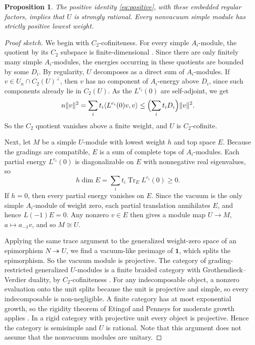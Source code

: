 \documentclass[11pt,a4paper]{article}
\newtheorem{proposition}[theorem]{Proposition}
\DeclareMathOperator{\Tr}{Tr}
\newcommand{\one}{\mathbf1}
\begin{document}
\begin{proposition}\label{prop:rational}
The positive identity \eqref{eq:positive}, with these embedded
regular factors, implies that $U$ is strongly rational. Every
nonvacuum simple module has strictly positive lowest weight.
\end{proposition}
\begin{proof}[Proof sketch]
We begin with $C_2$-cofiniteness. For every simple $A_i$-module, the
quotient by its $C_2$ subspace is finite-dimensional \cite{ABD}. Since
there are only finitely many simple $A_i$-modules, the energies
occurring in these quotients are bounded by some $D_i$. By regularity,
$U$ decomposes as a direct sum of $A_i$-modules. If
$v\in U_n\cap C_2(U)^\perp$, then $v$ has no component of
$A_i$-energy above $D_i$, since such components already lie in
$C_2(U)$. As the $L^{e_i}(0)$ are self-adjoint, we get
\begin{equation}\label{eq:C2}
 n\|v\|^2=\sum_i t_i\langle L^{e_i}(0)v,v\rangle
       \le\Bigl(\sum_i t_iD_i\Bigr)\|v\|^2.
\end{equation}
So the $C_2$ quotient vanishes above a finite weight, and $U$ is
$C_2$-cofinite.

Next, let $M$ be a simple $U$-module with lowest weight $h$ and top
space $E$. Because the gradings are compatible, $E$ is a sum of
complete tops of $A_i$-modules. Each partial energy $L^{e_i}(0)$ is
diagonalizable on $E$ with nonnegative real eigenvalues, so
\begin{equation}\label{eq:toptrace}
 h\dim E=\sum_i t_i\Tr_E L^{e_i}(0)\ge0.
\end{equation}
If $h=0$, then every partial energy vanishes on $E$. Since the vacuum
is the only simple $A_i$-module of weight zero, each partial
translation annihilates $E$, and hence $L(-1)E=0$. Any nonzero $v\in E$
then gives a module map $U\to M$, $a\mapsto a_{-1}v$, and so
$M\cong U$.

Applying the same trace argument to the generalized weight-zero space
of an epimorphism $N\twoheadrightarrow U$, we find a vacuum-like
preimage of $\one$, which splits the epimorphism. So the vacuum module
is projective. The category of grading-restricted generalized $U$-modules
is a finite braided category with Grothendieck--Verdier duality, by
$C_2$-cofiniteness \cite{McRae}. For any indecomposable object, a
nonzero evaluation onto the unit splits because the unit is projective
and simple, so every indecomposable is non-negligible. A finite
category has at most exponential growth, so the rigidity theorem of
Etingof and Penneys for moderate growth applies \cite{EP}. In a rigid
category with projective unit every object is projective. Hence the
category is semisimple and $U$ is rational. Note that this argument
does not assume that the nonvacuum modules are unitary.
\end{proof}
\end{document}
